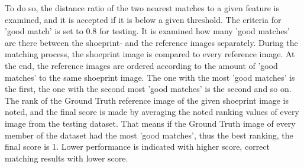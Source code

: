 \documentclass[draft,final]{vutinfth} %
\begin{document}
To do so, the distance ratio of the two nearest matches to a given feature is examined, and it is accepted if it is below a given threshold.
The criteria for 'good match' is set to 0.8 for testing.
It is examined how many 'good matches' are there between the shoeprint- and the reference images separately.
During the matching process, the shoeprint image is compared to every reference image.
At the end, the reference images are ordered according to the amount of 'good matches' to the same shoeprint image.
The one with the most 'good matches' is the first, the one with the second most 'good matches' is the second and so on.
The rank of the Ground Truth reference image of the given shoeprint image is noted, and the final score is made by averaging the noted ranking values  of every image from the testing dataset.
That means if the Ground Truth image of every member of the dataset had the most 'good matches', thus the best ranking, the final score is 1.
Lower performance is indicated with higher score, correct matching results with lower score.
\end{document}
